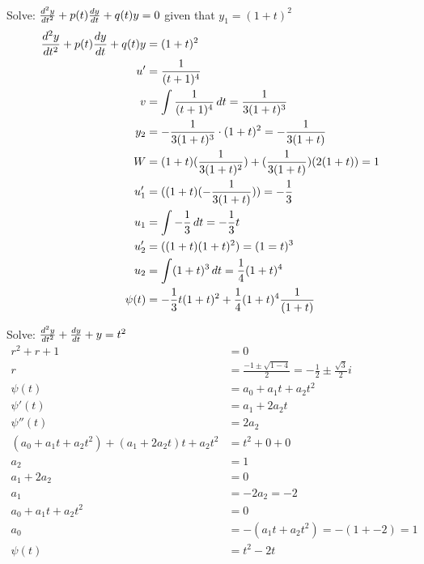 \documentclass[12pt]{article}
\begin{document}
\begin{example} Solve: $\frac{d^2y}{dt^2} + p(t)\frac{dy}{dt} + q(t)y = 0$ given that $y_1 = (1 + t)^2$ $$\begin{aligned} 
\frac{d^2y}{dt^2} + p(t)\frac{dy}{dt} + q(t)y &= (1 + t)^2 \\ u' &= \frac{1}{(t + 1)^4} \\ v &= \int \frac{1}{(t + 1)^4} \, dt = \frac{1}{3(1 + t)^3} \\ y_2 &= -\frac{1}{3(1 + t)^3} \cdot (1 + t)^2 = -\frac{1}{3(1 +t)} \\ 
W &= (1 + t)(\frac{1}{3(1 + t)^2}) + (\frac{1}{3(1 + t)})(2(1 + t)) = 1 \\
u'_1 &= ((1 + t)(-\frac{1}{3(1 + t)})) = -\frac{1}{3} \\ 
u_1 &= \int -\frac{1}{3} \, dt = -\frac{1}{3}t \\ 
u'_2 &= ((1 + t)(1 + t)^2) = (1 = t)^3 \\ 
u_2 &= \int (1 + t)^3 \, dt = \frac{1}{4}(1 + t)^4 \\ 
\psi(t) &= -\frac{1}{3}t(1 + t)^2 + \frac{1}{4}(1 + t)^4\frac{1}{(1 + t)} \end{aligned} $$ \end{example} 







\begin{example} Solve: $\frac{d^2y}{dt^2} + \frac{dy}{dt} + y = t^2 $ 
$$\begin{aligned} r^2 + r + 1 &= 0 \\ r &= \frac{-1 \pm \sqrt{1 - 4}}{2} = -\frac{1}{2} \pm \frac{\sqrt{3}}{2}i \\ 
\psi(t) &= a_0 + a_1t + a_2t^2 \\ \psi'(t) &= a_1 + 2a_2t \\ \psi''(t) &= 2a_2 \\ 
(a_0 + a_1t + a_2t^2) + (a_1 + 2a_2t)t + a_2t^2 &= t^2 + 0 + 0 \\ 
a_2 &= 1 \\ a_1 + 2a_2 &= 0 \\ a_1 &= -2a_2 = -2 \\ a_0 + a_1t + a_2t^2 &= 0 \\ a_0 &= -(a_1t + a_2t^2) = -(1 + -2) = 1 \\ \psi(t) &= t^2 - 2t \end{aligned} $$ \end{example} 
\end{document}

